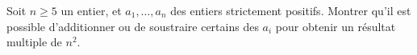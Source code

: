 Soit $n \geq 5$ un entier, et $a_1, \ldots, a_n$ des entiers strictement positifs. Montrer qu'il est possible d'additionner ou de soustraire certains des $a_i$ pour obtenir un résultat multiple de $n^2$.
